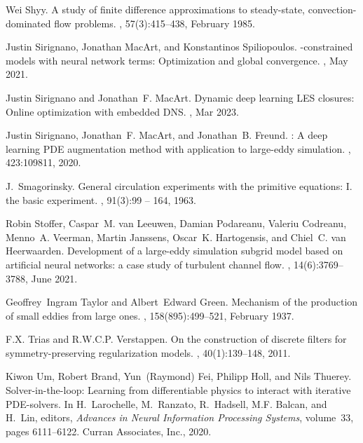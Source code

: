 \documentclass[preprint]{elsarticle}
\begin{document}
\begin{thebibliography}{10}
Wei Shyy.
\newblock A study of finite difference approximations to steady-state, convection-dominated flow problems.
, 57(3):415–438, February 1985.

Justin Sirignano, Jonathan MacArt, and Konstantinos Spiliopoulos.
-constrained models with neural network terms: Optimization and global convergence.
, May 2021.

Justin Sirignano and Jonathan~F. MacArt.
\newblock Dynamic deep learning {LES} closures: Online optimization with embedded {DNS}.
, Mar 2023.

Justin Sirignano, Jonathan~F. MacArt, and Jonathan~B. Freund.
: A deep learning {PDE} augmentation method with application to large-eddy simulation.
, 423:109811, 2020.

J.~Smagorinsky.
\newblock General circulation experiments with the primitive equations: I. the basic experiment.
, 91(3):99 -- 164, 1963.

Robin Stoffer, Caspar~M. van Leeuwen, Damian Podareanu, Valeriu Codreanu, Menno~A. Veerman, Martin Janssens, Oscar~K. Hartogensis, and Chiel~C. van Heerwaarden.
\newblock Development of a large-eddy simulation subgrid model based on artificial neural networks: a case study of turbulent channel flow.
, 14(6):3769–3788, June 2021.

Geoffrey~Ingram Taylor and Albert~Edward Green.
\newblock Mechanism of the production of small eddies from large ones.
, 158(895):499–521, February 1937.

F.X. Trias and R.W.C.P. Verstappen.
\newblock On the construction of discrete filters for symmetry-preserving regularization models.
, 40(1):139--148, 2011.

Kiwon Um, Robert Brand, Yun~(Raymond) Fei, Philipp Holl, and Nils Thuerey.
\newblock Solver-in-the-loop: Learning from differentiable physics to interact with iterative {PDE}-solvers.
\newblock In H.~Larochelle, M.~Ranzato, R.~Hadsell, M.F. Balcan, and H.~Lin, editors, {\em Advances in Neural Information Processing Systems}, volume~33, pages 6111--6122. Curran Associates, Inc., 2020.


\end{thebibliography}
\end{document}
